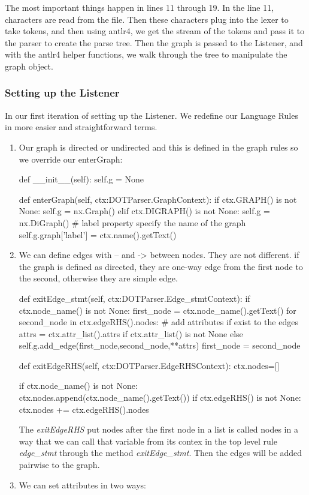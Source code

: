 The most important things happen in lines 11 
through 19. In the line 11, characters are 
read from the file. Then these characters plug 
into the lexer to take tokens, and then using 
antlr4, we get the stream of the tokens and pass 
it to the parser to create the parse tree. Then 
the graph is passed to the Listener, and with 
the antlr4 helper functions, we walk through 
the tree to manipulate the graph object.

\subsubsection{Setting up the Listener}

In our first iteration of setting up the 
Listener. We redefine our Language Rules in 
more easier and straightforward terms.
\begin{enumerate}
\item
Our graph is directed or undirected and this is 
defined in the graph rules so we override our
enterGraph:
\begin{python}
def __init__(self):
       self.g = None

def enterGraph(self, ctx:DOTParser.GraphContext):
    if ctx.GRAPH() is not None:
        self.g  = nx.Graph() 
    elif ctx.DIGRAPH() is not None:
        self.g = nx.DiGraph()
    # label property specify the name of the graph
    self.g.graph['label'] = ctx.name().getText()
\end{python}
\item
We can define edges with -- and -> between nodes.
They are not different. if the graph is defined as
directed, they are one-way edge from the first node to 
the second, otherwise they are simple edge.
\begin{python}
def exitEdge_stmt(self, ctx:DOTParser.Edge_stmtContext):
    if ctx.node_name() is not None:
        first_node = ctx.node_name().getText()
        for second_node in ctx.edgeRHS().nodes:
            # add attributes if exist to the edges
            attrs = ctx.attr_list().attrs if ctx.attr_list() is not None else {}
            self.g.add_edge(first_node,second_node,**attrs)
            first_node = second_node

def exitEdgeRHS(self, ctx:DOTParser.EdgeRHSContext):
    ctx.nodes=[]

    if ctx.node_name() is not None:
        ctx.nodes.append(ctx.node_name().getText())
    if ctx.edgeRHS() is not None:
        ctx.nodes += ctx.edgeRHS().nodes
\end{python}
The \textit{exitEdgeRHS} put nodes after the first
node in a list is called nodes in a way that we can
call that variable from its contex in the top level rule
\textit{edge_stmt} through the method \textit{exitEdge_stmt}.
Then the edges will be added pairwise to the graph.
\item
We can set attributes in two ways:


\end{enumerate}
